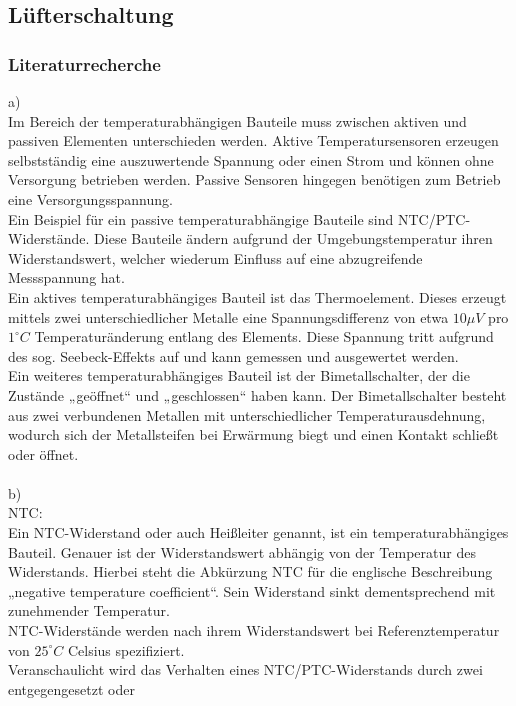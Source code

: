 \subsection{Lüfterschaltung}

\subsubsection{Literaturrecherche}

a)\\
Im Bereich der temperaturabhängigen Bauteile muss zwischen aktiven und passiven Elementen
unterschieden werden. Aktive Temperatursensoren erzeugen selbstständig eine auszuwertende
Spannung oder einen Strom und können ohne Versorgung betrieben werden. Passive Sensoren
hingegen benötigen zum Betrieb eine Versorgungsspannung.\\
Ein Beispiel für ein passive temperaturabhängige Bauteile sind NTC/PTC-Widerstände. Diese Bauteile
ändern aufgrund der Umgebungstemperatur ihren Widerstandswert, welcher wiederum Einfluss auf
eine abzugreifende Messspannung hat.\\
Ein aktives temperaturabhängiges Bauteil ist das Thermoelement. Dieses erzeugt mittels zwei
unterschiedlicher Metalle eine Spannungsdifferenz von etwa $10 \mu V$ pro $1^{\circ} C$ Temperaturänderung
entlang des Elements. Diese Spannung tritt aufgrund des sog. Seebeck-Effekts auf und kann
gemessen und ausgewertet werden.\\
Ein weiteres temperaturabhängiges Bauteil ist der Bimetallschalter, der die Zustände „geöffnet“ und
„geschlossen“ haben kann. Der Bimetallschalter besteht aus zwei verbundenen Metallen mit
unterschiedlicher Temperaturausdehnung, wodurch sich der Metallsteifen bei Erwärmung biegt und
einen Kontakt schließt oder öffnet. \cite{formelsammlung} \cite{elektro_masch} \\
\\
b) \\
NTC:\\
Ein NTC-Widerstand oder auch Heißleiter genannt, ist ein temperaturabhängiges Bauteil. Genauer ist
der Widerstandswert abhängig von der Temperatur des Widerstands. Hierbei steht die Abkürzung
NTC für die englische Beschreibung „negative temperature coefficient“. Sein Widerstand sinkt
dementsprechend mit zunehmender Temperatur.\\
NTC-Widerstände werden nach ihrem Widerstandswert bei Referenztemperatur von $25^{\circ} C$ Celsius
spezifiziert.\\
Veranschaulicht wird das Verhalten eines NTC/PTC-Widerstands durch zwei entgegengesetzt oder
